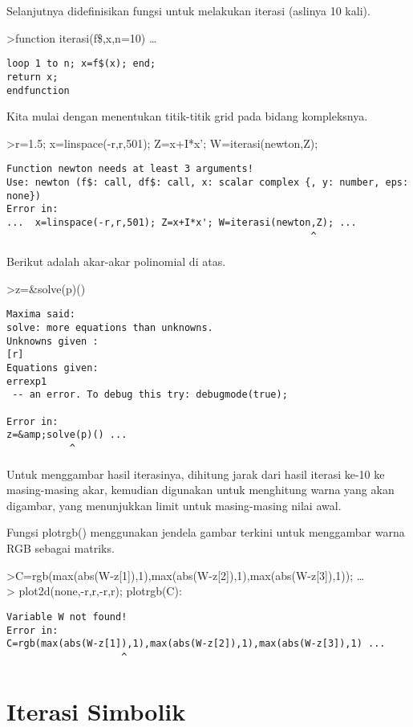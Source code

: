 \documentclass[
]{book}
\begin{document}
Selanjutnya didefinisikan fungsi untuk melakukan iterasi (aslinya 10 kali).

\textgreater function iterasi(f\$,x,n=10) \ldots{}

\begin{verbatim}
loop 1 to n; x=f$(x); end;
return x;
endfunction
\end{verbatim}

Kita mulai dengan menentukan titik-titik grid pada bidang kompleksnya.

\textgreater r=1.5; x=linspace(-r,r,501); Z=x+I*x'; W=iterasi(newton,Z);

\begin{verbatim}
Function newton needs at least 3 arguments!
Use: newton (f$: call, df$: call, x: scalar complex {, y: number, eps: none}) 
Error in:
...  x=linspace(-r,r,501); Z=x+I*x'; W=iterasi(newton,Z); ...
                                                     ^
\end{verbatim}

Berikut adalah akar-akar polinomial di atas.

\textgreater z=\&solve(p)()

\begin{verbatim}
Maxima said:
solve: more equations than unknowns.
Unknowns given :  
[r]
Equations given:  
errexp1
 -- an error. To debug this try: debugmode(true);

Error in:
z=&amp;solve(p)() ...
           ^
\end{verbatim}

Untuk menggambar hasil iterasinya, dihitung jarak dari hasil iterasi ke-10 ke masing-masing akar, kemudian digunakan untuk menghitung warna yang akan digambar, yang menunjukkan limit untuk masing-masing nilai awal.

Fungsi plotrgb() menggunakan jendela gambar terkini untuk menggambar warna RGB sebagai matriks.

\textgreater C=rgb(max(abs(W-z{[}1{]}),1),max(abs(W-z{[}2{]}),1),max(abs(W-z{[}3{]}),1)); \ldots{}\\
\textgreater{} plot2d(none,-r,r,-r,r); plotrgb(C):

\begin{verbatim}
Variable W not found!
Error in:
C=rgb(max(abs(W-z[1]),1),max(abs(W-z[2]),1),max(abs(W-z[3]),1) ...
                    ^
\end{verbatim}

\chapter{Iterasi Simbolik}\label{iterasi-simbolik}
\end{document}
